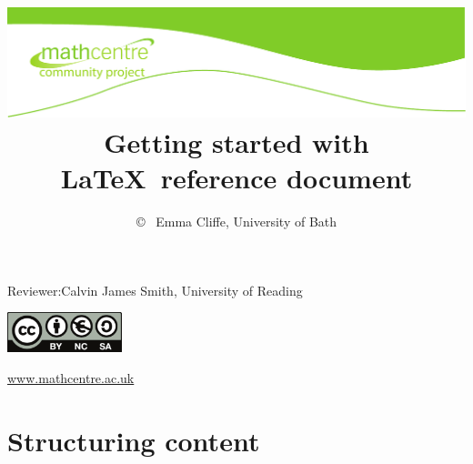 \documentclass[a4paper,14pt]{extarticle}
\title{
\includegraphics[width=\textwidth]{top-2colsgreen-community}
\\
Getting started with \LaTeX~reference document}
\author{\copyright ~ Emma Cliffe, University of Bath}
\date{}
\begin{document}


\renewcommand{\familydefault}{phv}
\selectfont

\maketitle

Reviewer:\qquad Calvin James Smith, University of Reading

\begin{center}
\includegraphics[width=0.25\textwidth]{by-nc-sa_eu}

\url{www.mathcentre.ac.uk}
\end{center}




\tableofcontents




\section{Structuring content}
\end{document}
